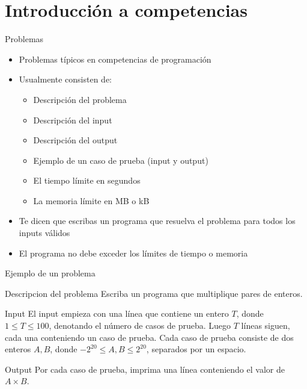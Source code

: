 \documentclass[10pt]{beamer}
\newcommand{\bi}{\begin{itemize}}
\newcommand{\ei}{\end{itemize}}
\begin{document}
\section{Introducción a competencias}

\begin{frame}{Problemas}
    \bi
        \item Problemas típicos en competencias de programación
        \item Usualmente consisten de:
            \bi
                \item Descripción del problema
                \item Descripción del input
                \item Descripción del output
                \item Ejemplo de un caso de prueba (input y output)
                \item El tiempo límite en segundos
                \item La memoria límite en MB o kB
            \ei
        \item Te dicen que escribas un programa que resuelva el problema para todos los inputs válidos
        \item El programa no debe exceder los límites de tiempo o memoria
    \ei
\end{frame}

\begin{frame}{Ejemplo de un problema}
    \begin{block}{Descripcion del problema}
    Escriba un programa que multiplique pares de enteros.
    \end{block}

    \vspace{10pt}

    \begin{block}{Input}
    El input empieza con una línea que contiene un entero $T$, donde $1\leq T \leq
    100$, denotando el número de casos de prueba. Luego $T$ líneas siguen, cada
    una conteniendo un caso de prueba. Cada caso de prueba consiste de dos enteros $A,B$,
    donde $-2^{20} \leq A,B \leq 2^{20}$, separados por un espacio.
    \end{block}

    \vspace{10pt}

    \begin{block}{Output}
    Por cada caso de prueba, imprima una línea conteniendo el valor de $A\times B$.
    \end{block}
\end{frame}
\end{document}

